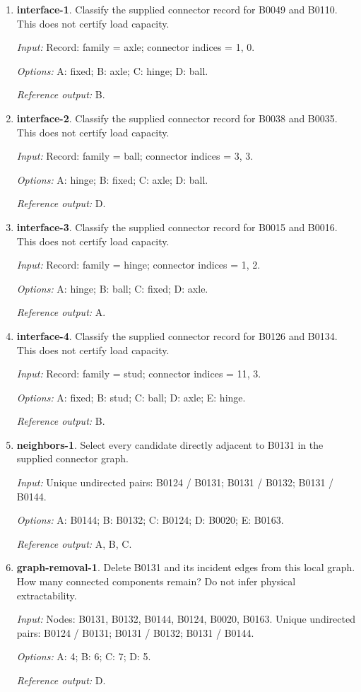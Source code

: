 \begin{enumerate}
\item \textbf{interface-1}. Classify the supplied connector record for B0049 and B0110. This does not certify load capacity.\par {\small \textit{Input:} Record: family = axle; connector indices = 1, 0. \par\textit{Options:} A: fixed; B: axle; C: hinge; D: ball. \par\textit{Reference output:} B.}
\item \textbf{interface-2}. Classify the supplied connector record for B0038 and B0035. This does not certify load capacity.\par {\small \textit{Input:} Record: family = ball; connector indices = 3, 3. \par\textit{Options:} A: hinge; B: fixed; C: axle; D: ball. \par\textit{Reference output:} D.}
\item \textbf{interface-3}. Classify the supplied connector record for B0015 and B0016. This does not certify load capacity.\par {\small \textit{Input:} Record: family = hinge; connector indices = 1, 2. \par\textit{Options:} A: hinge; B: ball; C: fixed; D: axle. \par\textit{Reference output:} A.}
\item \textbf{interface-4}. Classify the supplied connector record for B0126 and B0134. This does not certify load capacity.\par {\small \textit{Input:} Record: family = stud; connector indices = 11, 3. \par\textit{Options:} A: fixed; B: stud; C: ball; D: axle; E: hinge. \par\textit{Reference output:} B.}
\item \textbf{neighbors-1}. Select every candidate directly adjacent to B0131 in the supplied connector graph.\par {\small \textit{Input:} Unique undirected pairs: B0124 / B0131; B0131 / B0132; B0131 / B0144. \par\textit{Options:} A: B0144; B: B0132; C: B0124; D: B0020; E: B0163. \par\textit{Reference output:} A, B, C.}
\item \textbf{graph-removal-1}. Delete B0131 and its incident edges from this local graph. How many connected components remain? Do not infer physical extractability.\par {\small \textit{Input:} Nodes: B0131, B0132, B0144, B0124, B0020, B0163. Unique undirected pairs: B0124 / B0131; B0131 / B0132; B0131 / B0144. \par\textit{Options:} A: 4; B: 6; C: 7; D: 5. \par\textit{Reference output:} D.}

\end{enumerate}
